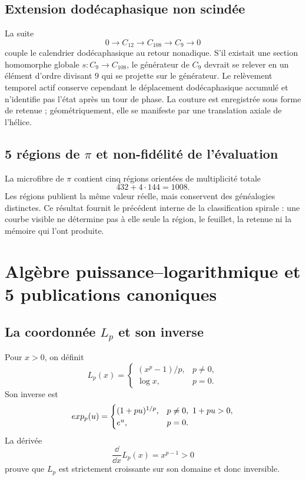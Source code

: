 \section{Extension dodécaphasique non scindée}

La suite
\[
 0\longrightarrow C_{12}\longrightarrow C_{108}
 \longrightarrow C_9\longrightarrow0
\]
couple le calendrier dodécaphasique au retour nonadique. S'il existait une section homomorphe globale \(s:C_9\to C_{108}\), le générateur de \(C_9\) devrait se relever en un élément d'ordre divisant \(9\) qui se projette sur le générateur. Le relèvement temporel actif conserve cependant le déplacement dodécaphasique accumulé et n'identifie pas l'état après un tour de phase. La couture est enregistrée sous forme de retenue ; géométriquement, elle se manifeste par une translation axiale de l'hélice.

\section{5 régions de \texorpdfstring{\(\pi\)}{pi} et non-fidélité de l'évaluation}

La microfibre de \(\pi\) contient cinq régions orientées de multiplicité totale
\[
 432+4\cdot144=1008.
\]
Les régions publient la même valeur réelle, mais conservent des généalogies distinctes. Ce résultat fournit le précédent interne de la classification spirale : une courbe visible ne détermine pas à elle seule la région, le feuillet, la retenue ni la mémoire qui l'ont produite.

\chapter{Algèbre puissance--logarithmique et 5 publications canoniques}

\section[Coordonnée puissance--logarithmique et inverse]{La coordonnée \(L_p\) et son inverse}

Pour \(x>0\), on définit
\[
 L_p(x)=
 \begin{cases}
 (x^p-1)/p,&p\neq0,\\
 \log x,&p=0.
 \end{cases}
\]
Son inverse est
\[
 exp_p(u)=
 \begin{cases}
 (1+pu)^{1/p},&p\neq0,\ 1+pu>0,\\
 e^u,&p=0.
 \end{cases}
\]
La dérivée
\[
 \frac{\dd}{\dd x}L_p(x)=x^{p-1}>0
\]
prouve que \(L_p\) est strictement croissante sur son domaine et donc inversible.


